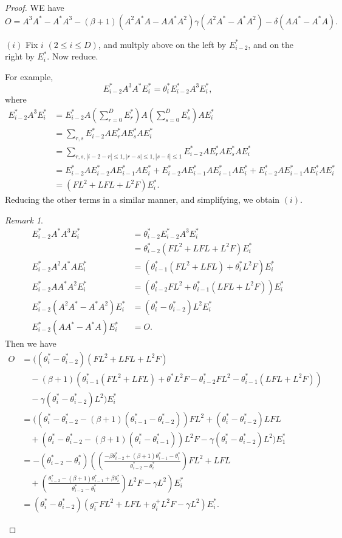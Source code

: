 \documentclass[
]{book}
\theoremstyle{definition}
\theoremstyle{definition}
\theoremstyle{definition}
\theoremstyle{definition}
\theoremstyle{remark}
\newtheorem*{remark}{Remark}
\begin{document}
\begin{proof}

WE have
\[O = A^3A^*-A^*A^3 - (\beta+1)(A^2A^*A-AA^*A^2)\gamma(A^2A^*-A^*A^2)-\delta(AA^*-A^*A).\]

\((i)\) Fix \(i\) \((2\leq i\leq D)\), and multply above on the left by \(E^*_{i-2}\), and on the right by \(E^*_i\). Now reduce.

For example,
\[E^*_{i-2}A^3A^*E^*_i = \theta^*_i E^*_{i-2}A^3 E^*_i,\]
where
\begin{align}
E^*_{i-2}A^3 E^*_i & = E^*_{i-2}A\left(\sum_{r=0}^D E^*_r\right)A\left(\sum_{s=0}^D E^*_s\right)AE^*_i\\
& = \sum_{r,s}E^*_{i-2}AE^*_r AE^*_s AE^*_i\\
& = \sum_{r,s, |i-2-r|\leq 1, |r-s|\leq 1, |s-i|\leq 1}E^*_{i-2}AE^*_r AE^*_s AE^*_i\\
& = E^*_{i-2}AE^*_{i-2}AE^*_{i-1}AE^*_i + E^*_{i-2}AE^*_{i-1}AE^*_{i-1}AE^*_i + E^*_{i-2}AE^*_{i-1}AE^*_{i}AE^*_i\\
& = (FL^2 + LFL + L^2F)E^*_i.
\end{align}
Reducing the other terms in a similar manner, and simplifying, we obtain \((i)\).

\begin{remark}
\begin{align}
E^*_{i-2}A^*A^3E^*_i & = \theta^*_{i-2}E^*_{i-2}A^3E^*_i\\
& = \theta^*_{i-2}(FL^2+LFL + L^2F)E^*_i\\
E^*_{i-2}A^2A^*AE^*_i & = (\theta^*_{i-1}(FL^2+LFL) + \theta^*_iL^2F)E^*_i\\
E^*_{i-2}AA^*A^2E^*_i & = (\theta^*_{i-2}FL^2 + \theta^*_{i-1}(LFL+L^2F))E^*_i\\
E^*_{i-2}(A^2A^*-A^*A^2)E^*_i & = (\theta^*_i-\theta^*_{i-2})L^2E^*_i\\
E^*_{i-2}(AA^*-A^*A)E^*_i & = O.
\end{align}
Then we have
\begin{align}
O &= ((\theta^*_i-\theta^*_{i-2})(FL^2+LFL+L^2F)\\
& \quad -(\beta+1)(\theta^*_{i-1}(FL^2+LFL) + \theta^* L^2F - \theta^*_{i-2}FL^2 - \theta^*_{i-1}(LFL+L^2F)) \\
& \quad -\gamma(\theta^*_i-\theta^*_{i-2})L^2)E^*_i\\
& = ((\theta^*_i-\theta^*_{i-2}-(\beta+1)(\theta^*_{i-1}-\theta^*_{i-2}))FL^2 + (\theta^*_i-\theta^*_{i-2})LFL\\
& \quad + (\theta^*_i-\theta^*_{i-2}-(\beta+1)(\theta^*_i-\theta^*_{i-1}))L^2F - \gamma(\theta^*_i-\theta^*_{i-2})L^2)E^*_1\\
& = -(\theta^*_{i-2}-\theta^*_i)\left(\left(\frac{-\beta \theta^*_{i-2}+(\beta+1)\theta^*_{i-1}-\theta^*_i}{\theta^*_{i-2}-\theta^*_i}\right)FL^2+LFL\right.\\
& \quad + \left. \left(\frac{\theta^*_{i-2}-(\beta+1)\theta^*_{i-1}+\beta \theta^*_i}{\theta^*_{i-2}-\theta^*_i}\right)L^2F - \gamma L^2\right)E^*_i\\
& = (\theta^*_i-\theta^*_{i-2})(g^-_iFL^2 + LFL + g^+_iL^2F - \gamma L^2)E^*_i.
\end{align}
\end{remark}


\end{proof}
\end{document}
